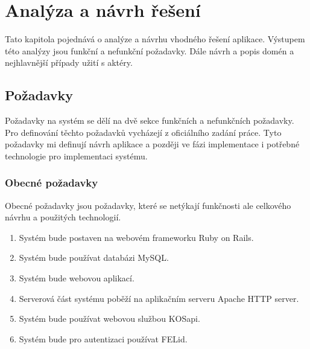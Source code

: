 \chapter{Analýza a návrh řešení}
Tato kapitola pojednává o analýze a návrhu vhodného řešení aplikace. Výstupem této analýzy jsou funkční a nefunkční požadavky. Dále návrh a popis domén a nejhlavnější případy užití s aktéry. 

\section{Požadavky}
Požadavky na systém se dělí na dvě sekce funkčních a nefunkčních požadavky. Pro definování těchto požadavků vycházejí z oficiálního zadání práce. Tyto požadavky mi definují návrh aplikace a později ve fázi implementace i potřebné technologie pro implementaci systému.
\subsection{Obecné požadavky}
Obecné požadavky jsou požadavky, které se netýkají funkčnosti ale celkového návrhu a použitých technologií.
\begin{enumerate}
\item Systém bude postaven na webovém frameworku Ruby on Rails.
\item Systém bude používat databázi MySQL.
\item Systém bude webovou aplikací.
\item Serverová část systému poběží na aplikačním serveru Apache HTTP server.
\item Systém bude používat webovou službou KOSapi.
\item Systém bude pro autentizaci používat FELid.
\end{enumerate}

